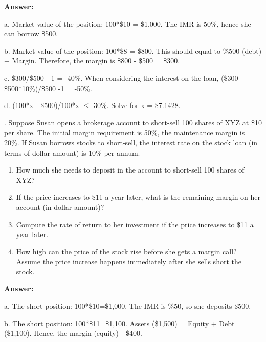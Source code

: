 \documentclass[11.5pt]{article}
\begin{document}
\vspace{10pt}

\indent \textbf{Answer:} 

a. Market value of the position: 100*\$10 = \$1,000. The IMR is 50\%, hence she can borrow \$500.

b. Market value of the position: 100*\$8 = \$800. This should equal to \%500 (debt) + Margin. Therefore, the margin is \$800 - \$500 = \$300.

c. \$300/\$500 - 1 = -40\%. When considering the interest on the loan, (\$300 - \$500*10\%)/\$500 -1 = -50\%.


d. (100*x - \$500)/100*x $\le$ 30\%. Solve for x = \$7.1428.




\vspace{40pt}



. Suppose Susan opens a brokerage account to short-sell 100 shares of XYZ at \$10 per share.  The initial margin requirement is 50\%, the maintenance margin is 20\%.  If Susan borrows stocks to short-sell, the interest rate on the stock loan (in terms of dollar amount) is 10\% per annum.  


\begin{enumerate}[a]
\item How much she needs to deposit in the account to short-sell 100 shares of XYZ?

\item If the price increases to \$11 a year later, what is the remaining margin on her account (in dollar amount)?

\item Compute the rate of return to her investment if the price increases to \$11 a year later.

\item How high can the price of the stock rise before she gets a margin call?  Assume the price increase happens immediately after she sells short the stock.

\end{enumerate}
	

\vspace{10pt}

\indent \textbf{Answer:} 

a. The short position: 100*\$10=\$1,000. The IMR is \%50, so she deposits \$500. 

b. The short position: 100*\$11=\$1,100. Assets (\$1,500) = Equity + Debt (\$1,100). Hence, the margin (equity) - \$400.
\end{document}
